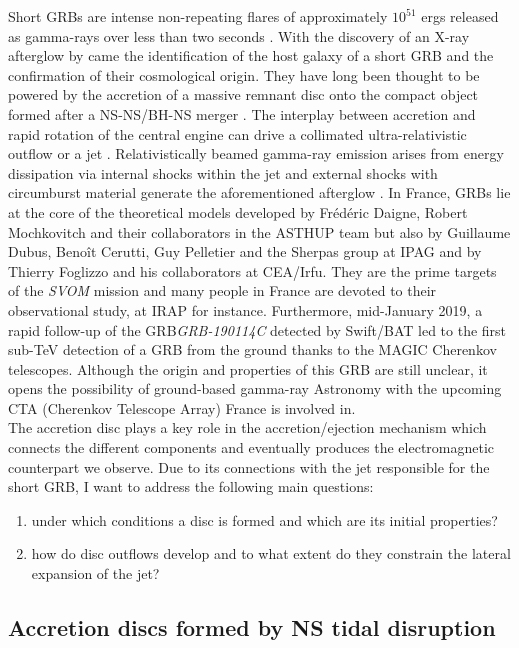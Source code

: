 \documentclass[11pt,onecolumn]{article}
\makeatletter
\newcommand{\grb}{GRB\xspace}
\newcommand{\grbs}{GRBs\xspace}
\newcommand*{\ns}{NS\@\xspace}
\newcommand*{\bh}{BH\@\xspace}
\makeatother
\begin{document}
Short \grbs are intense non-repeating flares of approximately $10^{51}$ ergs released as gamma-rays over less than two seconds \citep{Berger2014}. With the discovery of an X-ray afterglow by \citet{Gehrels2005} came the identification of the host galaxy of a short \grb and the confirmation of their cosmological origin. They have long been thought to be powered by the accretion of a massive remnant disc onto the compact object formed after a \ns-\ns/\bh-\ns merger \citep{Eichler1989}. The interplay between accretion and rapid rotation of the central engine can drive a collimated ultra-relativistic outflow or a jet \citep{Piran2005}. Relativistically beamed gamma-ray emission arises from energy dissipation via internal shocks within the jet \citep{Rees1992} and external shocks with circumburst material generate the aforementioned afterglow \citep{Kumar2015}. In France, \grbs lie at the core of the theoretical models developed by Fr\'ed\'eric Daigne, Robert Mochkovitch and their collaborators in the ASTHUP team but also by Guillaume Dubus, Beno\^it Cerutti, Guy Pelletier and the Sherpas group at IPAG and by Thierry Foglizzo and his collaborators at CEA/Irfu. They are the prime targets of the \textit{SVOM} mission and many people in France are devoted to their observational study, at IRAP for instance. Furthermore, mid-January 2019, a rapid follow-up of the \grb \textit{GRB-190114C} detected by Swift/BAT led to the first sub-TeV detection of a \grb from the ground thanks to the MAGIC Cherenkov telescopes. Although the origin and properties of this \grb are still unclear, it opens the possibility of ground-based gamma-ray Astronomy with the upcoming CTA (Cherenkov Telescope Array) France is involved in.\\

The accretion disc plays a key role in the accretion/ejection mechanism which connects the different components and eventually produces the electromagnetic counterpart we observe. Due to its connections with the jet responsible for the short \grb, I want to address the following main questions:
\begin{enumerate}[itemsep=0mm]
\item under which conditions a disc is formed and which are its initial properties?
\item how do disc outflows develop and to what extent do they constrain the lateral expansion of the jet?
\end{enumerate}

\subsection{Accretion discs formed by \ns tidal disruption}
\end{document}
